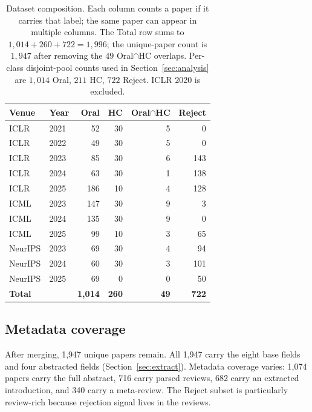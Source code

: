 \documentclass[10pt,a4paper]{article}
\begin{document}
\begin{table}[htbp]
\centering
\caption{Dataset composition. Each column counts a paper if it carries that label; the same paper can appear in multiple columns. The Total row sums to $1{,}014+260+722=1{,}996$; the unique-paper count is $1{,}947$ after removing the $49$ Oral$\cap$HC overlaps. Per-class disjoint-pool counts used in Section~\ref{sec:analysis} are $1{,}014$ Oral, $211$ HC, $722$ Reject. ICLR 2020 is excluded.}
\label{tab:data}
\small
\begin{tabular}{llrrrr}
\toprule
\textbf{Venue} & \textbf{Year} & \textbf{\textcolor{cblue}{Oral}} & \textbf{\textcolor{cgold}{HC}} & \textbf{Oral$\cap$HC} & \textbf{\textcolor{cred}{Reject}} \\
\midrule
ICLR    & 2021 &  52 & 30 & 5 &   0 \\
ICLR    & 2022 &  49 & 30 & 5 &   0 \\
ICLR    & 2023 &  85 & 30 & 6 & 143 \\
ICLR    & 2024 &  63 & 30 & 1 & 138 \\
ICLR    & 2025 & 186 & 10 & 4 & 128 \\
ICML    & 2023 & 147 & 30 & 9 &   3 \\
ICML    & 2024 & 135 & 30 & 9 &   0 \\
ICML    & 2025 &  99 & 10 & 3 &  65 \\
NeurIPS & 2023 &  69 & 30 & 4 &  94 \\
NeurIPS & 2024 &  60 & 30 & 3 & 101 \\
NeurIPS & 2025 &  69 &  0 & 0 &  50 \\
\midrule
\textbf{Total} &  & \textbf{1{,}014} & \textbf{260} & \textbf{49} & \textbf{722} \\
\bottomrule
\end{tabular}
\end{table}

\subsection{Metadata coverage}
\label{subsec:meta-coverage}

After merging, 1{,}947 unique papers remain. All 1{,}947 carry the eight base fields and four abstracted fields (Section~\ref{sec:extract}). Metadata coverage varies: 1{,}074 papers carry the full abstract, 716 carry parsed reviews, 682 carry an extracted introduction, and 340 carry a meta-review. The Reject subset is particularly review-rich because rejection signal lives in the reviews.
\end{document}
